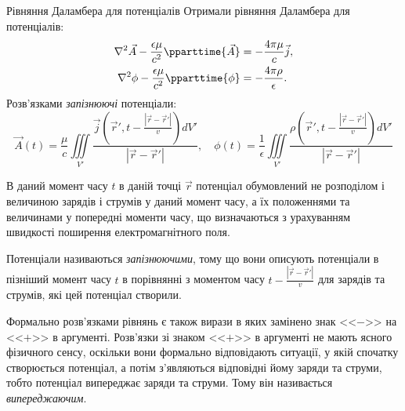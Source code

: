 \documentclass[onlytextwidth]{beamer}
\let\vect\vec
\begin{document}
\begin{frame}{Рівняння Даламбера для потенціалів}{}
	Отримали рівняння Даламбера для потенціалів:
	\begin{align*}
		\nabla^2\vect{A} - \frac{ \epsilon\mu }{c^2} \pparttime{\vect{A}} & = - \frac{4\pi\mu}{c}\vect{j}, \\
		\nabla^2\phi - \frac{ \epsilon\mu }{c^2} \pparttime{\phi}         & = - \frac{4\pi\rho}{\epsilon}.
	\end{align*}
	Розв'язками \emph{запізнюючі} потенціали:
	{\small 	\begin{equation*}
		\vect{A}(t)= \frac{\mu}{c} \iiint\limits_{V'} \frac{\vect{j}\left(\vect{r}', t - \frac{|\vect{r} - \vect{r}'|}{v}\right) dV'}{|\vect{r} - \vect{r}'|}, \quad
		\phi(t) = \frac{1}{\epsilon} \iiint\limits_{V'} \frac{\rho\left(\vect{r}', t - \frac{|\vect{r} - \vect{r}'|}{v}\right) dV'}{|\vect{r} - \vect{r}'|}
	\end{equation*}}

	\begin{overprint}
		\begin{alertblock}{}\small\justifying
			В даний момент часу $ t $ в даній точці $ \vect{r} $ потенціал обумовлений не розподілом і величиною зарядів і струмів у даний момент часу, а їх положеннями та величинами у попередні моменти часу, що визначаються з урахуванням швидкості поширення електромагнітного поля.
		\end{alertblock}
		\begin{alertblock}{}\small\justifying
			Потенціали називаються \emph{запізнюючими}, тому що вони описують потенціали в пізніший момент часу $ t $ в порівнянні з моментом часу $ t - \frac{|\vect{r} - \vect{r}'|}{v} $ для зарядів та струмів, які цей потенціал створили.
		\end{alertblock}
		\begin{alertblock}{}\small\justifying
			Формально розв'язками рівнянь є також вирази в яких замінено знак <<$ - $>> на <<$ + $>> в аргументі. Розв'язки зі знаком <<$ + $>> в аргументі не мають ясного фізичного сенсу, оскільки вони формально відповідають ситуації, у якій спочатку створюється потенціал, а потім з'являються відповідні йому заряди та струми, тобто потенціал випереджає заряди та струми. Тому він називається \emph{випереджаючим}.
		\end{alertblock}
	\end{overprint}
\end{frame}
\end{document}
